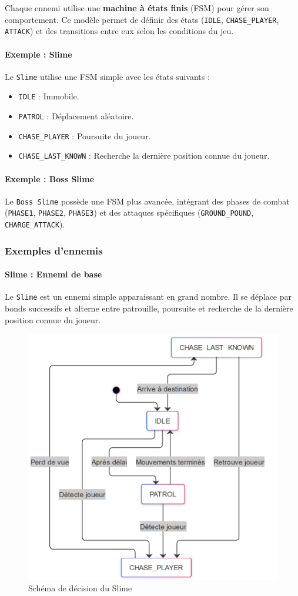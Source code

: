 \documentclass[a4paper,11pt]{article}
\begin{document}
Chaque ennemi utilise une \textbf{machine à états finis} (FSM) pour gérer son comportement. Ce modèle permet de définir des états (\texttt{IDLE}, \texttt{CHASE\_PLAYER}, \texttt{ATTACK}) et des transitions entre eux selon les conditions du jeu.

\paragraph{Exemple : Slime}  
Le \texttt{Slime} utilise une FSM simple avec les états suivants :
\begin{itemize}
    \item \texttt{IDLE} : Immobile.
    \item \texttt{PATROL} : Déplacement aléatoire.
    \item \texttt{CHASE\_PLAYER} : Poursuite du joueur.
    \item \texttt{CHASE\_LAST\_KNOWN} : Recherche la dernière position connue du joueur.
\end{itemize}

\paragraph{Exemple : Boss Slime}  
Le \texttt{Boss Slime} possède une FSM plus avancée, intégrant des phases de combat (\texttt{PHASE1}, \texttt{PHASE2}, \texttt{PHASE3}) et des attaques spécifiques (\texttt{GROUND\_POUND}, \texttt{CHARGE\_ATTACK}).

\subsubsection{Exemples d’ennemis}
\label{sec:exemples_ennemis}

\paragraph{Slime : Ennemi de base}  
Le \texttt{Slime} est un ennemi simple apparaissant en grand nombre. Il se déplace par bonds successifs et alterne entre patrouille, poursuite et recherche de la dernière position connue du joueur.

\begin{figure}[h]
    \centering
    \includegraphics[width=0.50\linewidth]{img/slimeFSM.png}
    \caption{Schéma de décision du Slime}
    \label{fig:slime_fsm}
\end{figure}
\end{document}
